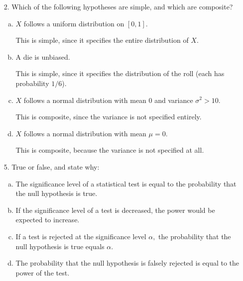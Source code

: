 \documentclass{article}
\begin{document}
\begin{itemize}
	\item[2.] Which of the following hypotheses are simple, and which are composite?

		\begin{enumerate}[a.]
			\item $X$ follows a uniform distribution on $[0, 1].$
				\begin{answer*}
					This is simple, since it specifies the entire distribution of $X.$
				\end{answer*}

			\item A die is unbiased.
				\begin{answer*}
					This is simple, since it specifies the distribution of the roll (each has probability $1/6$).
				\end{answer*}

			\item $X$ follows a normal distribution with mean 0 and variance $\sigma^2>10.$
				\begin{answer*}
					This is composite, since the variance is not specified entirely.
				\end{answer*}

			\item $X$ follows a normal distribution with mean $\mu=0.$
				\begin{answer*}
					This is composite, because the variance is not specified at all.
				\end{answer*}
				
		\end{enumerate}

	\item[5.] True or false, and state why:

		\begin{enumerate}[a.]
			\item The significance level of a statistical test is equal to the probability that the null hypothesis is true.

			\item If the significance level of a test is decreased, the power would be expected to increase.

			\item If a test is rejected at the significance level $\alpha,$ the probability that the null hypothesis is true equals $\alpha.$

			\item The probability that the null hypothesis is falsely rejected is equal to the power of the test.


\end{enumerate}
\end{itemize}
\end{document}
